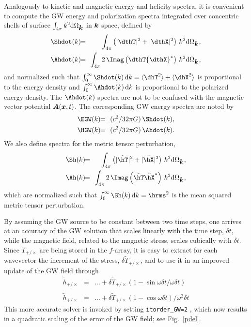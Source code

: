 \documentclass[\mydriver,12pt,twoside,notitlepage,a4paper]{article}
\makeatletter
\newcommand{\code}[1]{\texttt{#1}}
\newcommand{\cmd}{\command}
\newcommand{\command}[2][]{%
  \def\index@{#1}%
  \code{#2}%
  \ifx\index@\@empty\index{#2@\emph{#2}}%
  \else\index{#1@\emph{#1}}%
  \fi%
}
\renewcommand{\vec}[1]{\mbox{\boldmath{$#1$}}}
\newcommand{\Av}            {\vec{A}}
\newcommand{\kv}            {\vec{k}}
\newcommand{\xv}            {\vec{x}}
\newcommand{\bra}[1]{\langle #1\rangle}
\newcommand{\dd}{{\rm d} {}}
\makeatother
\begin{document}
Analogously to kinetic and magnetic energy and helicity spectra, it is
convenient to compute the GW energy and polarization spectra integrated
over concentric shells of surface $\int_{4\pi}k^2\dd\Omega_{\kv}$ in $\kv$
space, defined by
\begin{eqnarray}
\Shdot(k)\!\!&=&\!\!\int_{4\pi}\left(|\dthT|^2+|\dthX|^2\right)\,k^2\dd\Omega_{\kv},\\
\Ahdot(k)\!\!&=&\!\!\int_{4\pi}2\,\Imag\left(\dthT{{\dthX}}^\ast\right)\,k^2\dd\Omega_{\kv},
\end{eqnarray}
and normalized such that $\int_0^\infty\Shdot(k)\,\dd k=\bra{\dhT^2}+\bra{\dhX^2}$
is proportional to the energy density and $\int_0^\infty \Ahdot(k)\,\dd k$
is proportional to the polarized energy density.
The $\Ahdot(k)$ spectra are not to be confused with the magnetic vector
potential $\Av(\xv,t)$.
The corresponding GW energy spectra are noted by
\begin{eqnarray}
\EGW(k)\!\!&=&\!\!(c^2/32\pi G)\,\Shdot(k),\\
\HGW(k)\!\!&=&\!\!(c^2/32\pi G)\,\Ahdot(k).
\end{eqnarray}
We also define spectra for the metric tensor perturbation,
\begin{eqnarray}
\Sh(k)\!\!&=&\!\!\int_{4\pi}\left(|\tilde\hT|^2+|\tilde\hX|^2\right)\,k^2\dd\Omega_{\kv},\\
\Ah(k)\!\!&=&\!\!\int_{4\pi}2\,\Imag\left(\tilde\hT\tilde\hX^\ast\right)\,k^2\dd\Omega_{\kv},
\end{eqnarray}
which are normalized such that $\int_0^\infty\Sh(k)\,\dd k=\hrms^2$ is the
mean squared metric tensor perturbation.

By assuming the GW source to be constant between two time steps, one
arrives at an accuracy of the GW solution that scales linearly with the
time step, $\delta t$, while the magnetic field, related to the magnetic
stress, scales cubically with $\delta t$.
Since $\tilde{T}_{+/\times}$ are being stored in the $f$-array, it is
easy to extract for each wavevector the increment of the stress,
$\delta\tilde{T}_{+/\times}$, and to use it in an improved update
of the GW field through
\begin{eqnarray}
\tilde{h}_{+/\times}\!\!&=&\!\!...+\delta\tilde{T}_{+/\times}\left(1-\sin\omega\delta t/\omega\delta t\right)\\
\dot\tilde{h}_{+/\times}\!\!&=&\!\!...+\delta\tilde{T}_{+/\times}\left(1-\cos\omega\delta t\right)/\omega^2\delta t
\end{eqnarray}
This more accurate solver is invoked by setting \cmd{itorder_GW=2},
which now results in a quadratic scaling of the error of the GW field;
see Fig.~\ref{pdel}.
\end{document}
